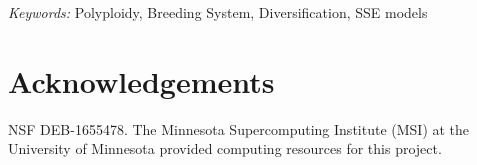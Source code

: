 \documentclass[11pt]{article}
\begin{document}
\vfill

\noindent
\textit{Keywords:} 
Polyploidy,
Breeding System,
Diversification, SSE models

\vfill

\linenumbers


\clearpage



\clearpage





\section{Acknowledgements}

NSF DEB-1655478.
The Minnesota Supercomputing Institute (MSI) at the University of Minnesota provided computing resources for this project.


\clearpage


\setstretch{\stretchby}
\end{document}
